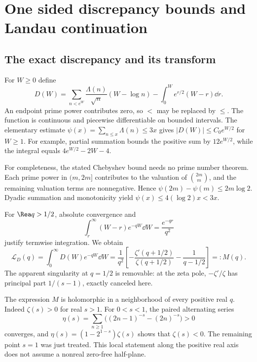 \section{One sided discrepancy bounds and Landau continuation}
\subsection{The exact discrepancy and its transform}
For $W\ge0$ define
\begin{equation}\label{eq:D}
D(W)=\sum_{n<e^W}\frac{\Lambda(n)}{\sqrt n}(W-\log n)-\int_0^W e^{r/2}(W-r)\dd r.
\end{equation}
An endpoint prime power contributes zero, so $<$ may be replaced by $\le$. The function is continuous and piecewise differentiable on bounded intervals. The elementary estimate $\psi(x)=\sum_{n\le x}\Lambda(n)\le3x$ gives $|D(W)|\le C_0e^{W/2}$ for $W\ge1$. For example, partial summation bounds the positive sum by $12e^{W/2}$, while the integral equals $4e^{W/2}-2W-4$.

For completeness, the stated Chebyshev bound needs no prime number theorem. Each prime power in $(m,2m]$ contributes to the valuation of $\binom{2m}{m}$, and the remaining valuation terms are nonnegative. Hence $\psi(2m)-\psi(m)\le2m\log2$. Dyadic summation and monotonicity yield $\psi(x)\le4(\log2)x<3x$.

For $\Rea q>1/2$, absolute convergence and
\[
\int_r^\infty(W-r)e^{-qW}\dd W=\frac{e^{-qr}}{q^2}
\]
justify termwise integration. We obtain
\begin{equation}\label{eq:LD}
\mathcal L_D(q)=\int_0^\infty D(W)e^{-qW}\dd W
=\frac1{q^2}\left[-\frac{\zeta'(q+1/2)}{\zeta(q+1/2)}-\frac1{q-1/2}\right]=:M(q).
\end{equation}
The apparent singularity at $q=1/2$ is removable: at the zeta pole, $-\zeta'/\zeta$ has principal part $1/(s-1)$, exactly canceled here.

The expression $M$ is holomorphic in a neighborhood of every positive real $q$. Indeed $\zeta(s)>0$ for real $s>1$. For $0<s<1$, the paired alternating series
\[
\eta(s)=\sum_{n\ge1}\bigl((2n-1)^{-s}-(2n)^{-s}\bigr)>0
\]
converges, and $\eta(s)=(1-2^{1-s})\zeta(s)$ shows that $\zeta(s)<0$. The remaining point $s=1$ was just treated. This local statement along the positive real axis does not assume a nonreal zero-free half-plane.

